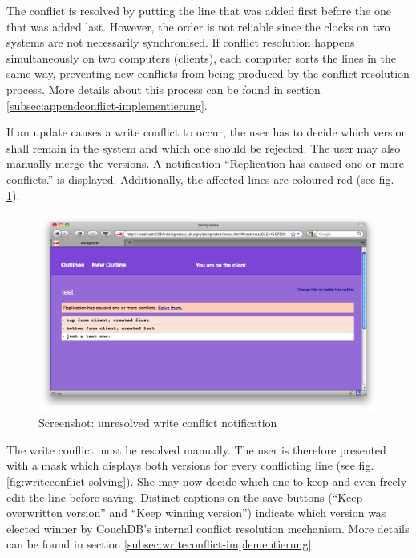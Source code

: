 The conflict is resolved by putting the line that was added first before the one that was added last. However, the order is not reliable since the clocks on two systems are not necessarily synchronised. If conflict resolution happens simultaneously on two computers (clients), each computer sorts the lines in the same way, preventing new conflicts from being produced by the conflict resolution process. More details about this process can be found in section \ref{subsec:appendconflict-implementierung}.


If an update causes a write conflict to occur, the user has to decide which version shall remain in the system and which one should be rejected. The user may also manually merge the versions. A notification \enquote{Replication has caused one or more conflicts.} is displayed. Additionally, the affected lines are coloured red (see fig. \ref{fig:writeconflict}).

\medskip
\begin{figure}[ht] 
  \begin{center}
  \includegraphics[width=\textwidth]{grafik/screenshot-write-conflict} 
  \end{center}
  \caption{Screenshot: unresolved write conflict notification}
  \label{fig:writeconflict} 
\end{figure}

The write conflict must be resolved manually. The user is therefore presented with a mask which displays both versions for every conflicting line (see fig. \ref{fig:writeconflict-solving}). She may now decide which one to keep and even freely edit the line before saving. Distinct captions on the save buttons (\enquote{Keep overwritten version} and \enquote{Keep winning version}) indicate which version was elected winner by CouchDB's internal conflict resolution mechanism. More details can be found in section \ref{subsec:writeconflict-implementierung}.

